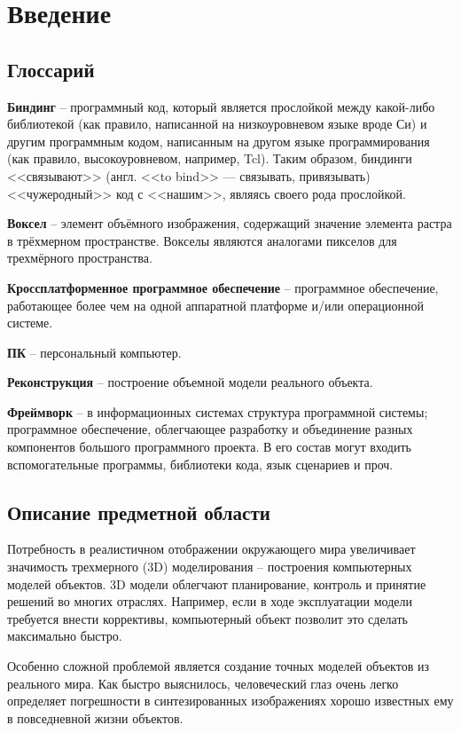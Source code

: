 \section{Введение}

\subsection{Глоссарий}
\textbf{Биндинг} -- программный код, который является прослойкой между какой-либо библиотекой (как правило, написанной на низкоуровневом языке вроде Си) и другим программным кодом, написанным на другом языке программирования (как правило, высокоуровневом, например, Tcl). Таким образом, биндинги <<связывают>> (англ. <<to bind>> — связывать, привязывать) <<чужеродный>> код с <<нашим>>, являясь своего рода прослойкой.~\cite{bindings}

\textbf{Воксел} -- элемент объёмного изображения, содержащий значение элемента растра в трёхмерном пространстве. Вокселы являются аналогами пикселов для трехмёрного пространства.~\cite{wiki_voxel}

\textbf{Кроссплатформенное программное обеспечение} -- программное обеспечение, работающее более чем на одной аппаратной платформе и/или операционной системе.~\cite{wiki_crossplatfom}

\textbf{ПК} -- персональный компьютер.

\textbf{Реконструкция} -- построение объемной модели реального объекта.

\textbf{Фреймворк} -- в информационных системах структура программной системы; программное обеспечение, облегчающее разработку и объединение разных компонентов большого программного проекта. В его состав могут входить вспомогательные программы, библиотеки кода, язык сценариев и проч.~\cite{wiki_framework}

\subsection{Описание предметной области}
Потребность в реалистичном отображении окружающего мира увеличивает значимость трехмерного (3D) моделирования -- построения компьютерных моделей объектов. 3D модели облегчают планирование, контроль и принятие решений во многих отраслях. Например, если в ходе эксплуатации модели требуется внести коррективы, компьютерный объект позволит это сделать максимально быстро.

Особенно сложной проблемой является создание точных моделей объектов из реального мира. Как быстро выяснилось, человеческий глаз очень легко определяет погрешности в синтезированных изображениях хорошо известных ему в повседневной жизни объектов.

